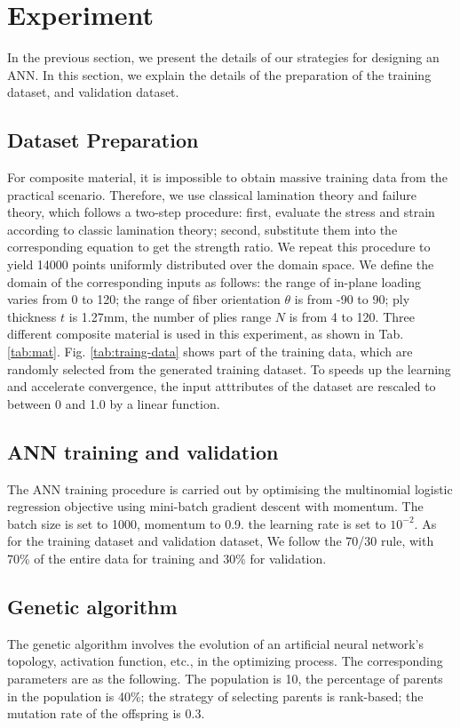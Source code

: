 \section{Experiment}
In the previous section, we present the details of our strategies for designing
an ANN. In this section, we explain the details of the preparation of the
training dataset, and validation dataset.
\subsection{Dataset Preparation}
For composite material, it is impossible to obtain massive training data from
the practical scenario. Therefore, we use classical lamination theory and
failure theory, which follows a two-step procedure: first, evaluate the stress
and strain according to classic lamination theory; second, substitute them into
the corresponding equation to get the strength ratio. We repeat this procedure
to yield 14000 points uniformly distributed over the domain space. We define
the domain of the corresponding inputs as follows: the range of in-plane
loading varies from 0 to 120; the range of fiber orientation $\theta$ is from
-90 to 90; ply thickness $t$ is 1.27mm, the number of plies range $N$ is from 4
to 120. Three different composite material is used in this experiment, as shown
in Tab. \ref{tab:mat}. Fig. \ref{tab:traing-data} shows part of the training
data, which are randomly selected from the generated training dataset.  To
speeds up the learning and accelerate convergence, the input atttributes of the
dataset are rescaled to between 0 and 1.0 by a linear function.




\subsection{ANN training and validation}
The ANN training procedure is carried out by optimising the multinomial
logistic regression objective using mini-batch gradient
descent\cite{lecun1989backpropagation} with momentum. The batch size is set to
1000, momentum to 0.9. the learning rate is set to $10^{-2}$. As for the
training dataset and validation dataset, We follow the 70/30 rule, with 70\% of
the entire data for training and 30\% for validation.

\subsection{Genetic algorithm}
The genetic algorithm involves the evolution of an artificial neural network’s
topology, activation function, etc., in the optimizing process.  The
corresponding parameters are as the following. The population is 10, the
percentage of parents in the population is 40\%; the strategy of selecting
parents is rank-based; the mutation rate of the offspring is 0.3.

